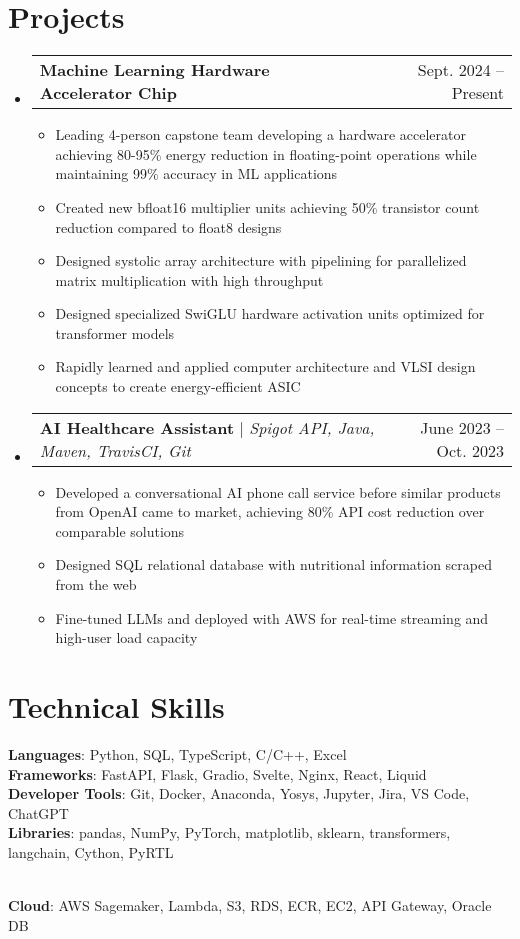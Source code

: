 \documentclass[letterpaper,11pt]{article}
\makeatletter
\newcommand{\resumeItem}[1]{
  \item\small{
    {#1 \vspace{-2pt}}
  }
}
\newcommand{\resumeProjectHeading}[2]{
    \item
    \begin{tabular*}{0.97\textwidth}{l@{\extracolsep{\fill}}r}
      \small#1 & #2 \\
    \end{tabular*}\vspace{-7pt}
}
\newcommand{\resumeSubHeadingListStart}{\begin{itemize}[leftmargin=0.15in, label={}]}
\newcommand{\resumeSubHeadingListEnd}{\end{itemize}}
\newcommand{\resumeItemListStart}{\begin{itemize}}
\newcommand{\resumeItemListEnd}{\end{itemize}\vspace{-5pt}}
\makeatother
\begin{document}
\section{Projects}
    \resumeSubHeadingListStart
      \resumeProjectHeading
          {\textbf{Machine Learning Hardware Accelerator Chip}}{Sept. 2024 -- Present}
          \resumeItemListStart
            \resumeItem{Leading 4-person capstone team developing a hardware accelerator achieving 80-95\% energy reduction in floating-point operations while maintaining 99\% accuracy in ML applications}
            \resumeItem{Created new bfloat16 multiplier units achieving 50\% transistor count reduction compared to float8 designs}
            \resumeItem{Designed systolic array architecture with pipelining for parallelized matrix multiplication with high throughput}
            \resumeItem{Designed specialized SwiGLU hardware activation units optimized for transformer models}
            \resumeItem{Rapidly learned and applied computer architecture and VLSI design concepts to create energy-efficient ASIC}
          \resumeItemListEnd
      \resumeProjectHeading
          {\textbf{AI Healthcare Assistant} $|$ \emph{Spigot API, Java, Maven, TravisCI, Git}}{June 2023 -- Oct. 2023}
          \resumeItemListStart
            \resumeItem{Developed a conversational AI phone call service before similar products from OpenAI came to market, achieving 80\% API cost reduction over comparable solutions}
            \resumeItem{Designed SQL relational database with nutritional information scraped from the web}
            \resumeItem{Fine-tuned LLMs and deployed with AWS for real-time streaming and high-user load capacity}
          \resumeItemListEnd
    \resumeSubHeadingListEnd



%
\section{Technical Skills}
 \begin{itemize}[leftmargin=0.15in, label={}]
    \small{\item{
     \textbf{Languages}{: Python, SQL, TypeScript, C/C++, Excel} \\
     \textbf{Frameworks}{: FastAPI, Flask, Gradio, Svelte, Nginx, React, Liquid} \\
     \textbf{Developer Tools}{: Git, Docker, Anaconda, Yosys, Jupyter, Jira, VS Code, ChatGPT} \\ 
     \textbf{Libraries}{: pandas, NumPy, PyTorch, matplotlib, sklearn, transformers, langchain, Cython, PyRTL} }} \\
     \textbf{Cloud}{: AWS Sagemaker, Lambda, S3, RDS, ECR, EC2, API Gateway, Oracle DB}
 \end{itemize}


\end{document}

